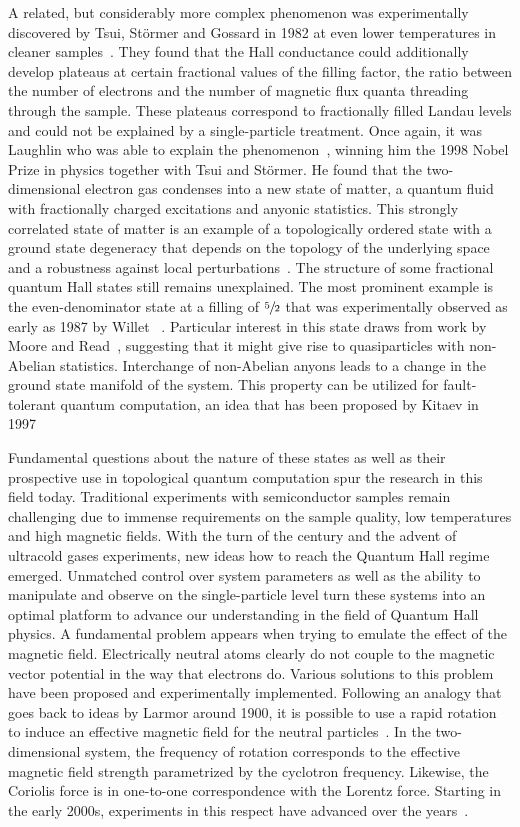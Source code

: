 A related, but considerably more complex phenomenon was experimentally discovered by Tsui, Störmer and Gossard in 1982 at even lower temperatures in cleaner samples~\cite{Tsui1982}.
They found that the Hall conductance could additionally develop plateaus at certain fractional values of the filling factor, the ratio between the number of electrons and the number of magnetic flux quanta threading through the sample.
These plateaus correspond to fractionally filled Landau levels and could not be explained by a single-particle treatment.
Once again, it was Laughlin who was able to explain the phenomenon~\cite{Laughlin1983}, winning him the 1998 Nobel Prize in physics together with Tsui and Störmer.
He found that the two-dimensional electron gas condenses into a new state of matter, a quantum fluid with fractionally charged excitations and anyonic statistics.
This strongly correlated state of matter is an example of a topologically ordered state with a ground state degeneracy that depends on the topology of the underlying space and a robustness against local perturbations~\cite{Wen1990,Wen1995}.
The structure of some fractional quantum Hall states still remains unexplained.
The most prominent example is the even-denominator state at a filling of $\sfrac{5}{2}$ that was experimentally observed as early as 1987 by Willet \etal~\cite{Willett1987}.
Particular interest in this state draws from work by Moore and Read~\cite{Moore1991}, suggesting that it might give rise to quasiparticles with non-Abelian statistics.
Interchange of non-Abelian anyons leads to a change in the ground state manifold of the system. This property can be utilized for fault-tolerant quantum computation, an idea that has been proposed by Kitaev in 1997~\cite{Kitaev2003}

Fundamental questions about the nature of these states as well as their prospective use in topological quantum computation spur the research in this field today.
Traditional experiments with semiconductor samples remain challenging due to immense requirements on the sample quality, low temperatures and high magnetic fields.
With the turn of the century and the advent of ultracold gases experiments, new ideas how to reach the Quantum Hall regime emerged.
Unmatched control over system parameters as well as the ability to manipulate and observe on the single-particle level turn these systems into an optimal platform to advance our understanding in the field of Quantum Hall physics.
A fundamental problem appears when trying to emulate the effect of the magnetic field.
Electrically neutral atoms clearly do not couple to the magnetic vector potential in the way that electrons do.
Various solutions to this problem have been proposed and experimentally implemented.
Following an analogy that goes back to ideas by Larmor around 1900, it is possible to use a rapid rotation to induce an effective magnetic field for the neutral particles~\cite{Larmor1900}.
In the two-dimensional system, the frequency of rotation corresponds to the effective magnetic field strength parametrized by the cyclotron frequency.
Likewise, the Coriolis force is in one-to-one correspondence with the Lorentz force.
Starting in the early 2000s, experiments in this respect have advanced over the years~\cite{Schweikhard2004,Bretin2004,Cooper2008,Fetter2009}.

